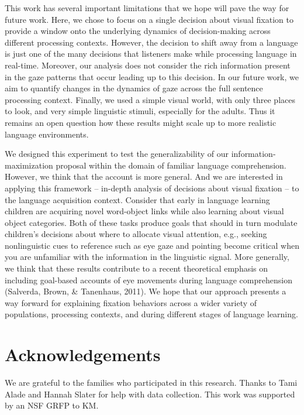 \documentclass[10pt, letterpaper]{article}
\begin{document}
This work has several important limitations that we hope will pave the
way for future work. Here, we chose to focus on a single decision about
visual fixation to provide a window onto the underlying dynamics of
decision-making across different processing contexts. However, the
decision to shift away from a language is just one of the many decisions
that listeners make while processing language in real-time. Moreover,
our analysis does not consider the rich information present in the gaze
patterns that occur leading up to this decision. In our future work, we
aim to quantify changes in the dynamics of gaze across the full sentence
processing context. Finally, we used a simple visual world, with only
three places to look, and very simple linguistic stimuli, especially for
the adults. Thus it remains an open question how these results might
scale up to more realistic language environments.

We designed this experiment to test the generalizability of our
information-maximization proposal within the domain of familiar language
comprehension. However, we think that the account is more general. And
we are interested in applying this framework -- in-depth analysis of
decisions about visual fixation -- to the language acquisition context.
Consider that early in language learning children are acquiring novel
word-object links while also learning about visual object categories.
Both of these tasks produce goals that should in turn modulate
children's decisions about where to allocate visual attention, e.g.,
seeking nonlinguistic cues to reference such as eye gaze and pointing
become critical when you are unfamiliar with the information in the
linguistic signal. More generally, we think that these results
contribute to a recent theoretical emphasis on including goal-based
accounts of eye movements during language comprehension (Salverda,
Brown, \& Tanenhaus, 2011). We hope that our approach presents a way
forward for explaining fixation behaviors across a wider variety of
populations, processing contexts, and during different stages of
language learning.

\section{Acknowledgements}\label{acknowledgements}

We are grateful to the families who participated in this research.
Thanks to Tami Alade and Hannah Slater for help with data collection.
This work was supported by an NSF GRFP to KM.
\end{document}
